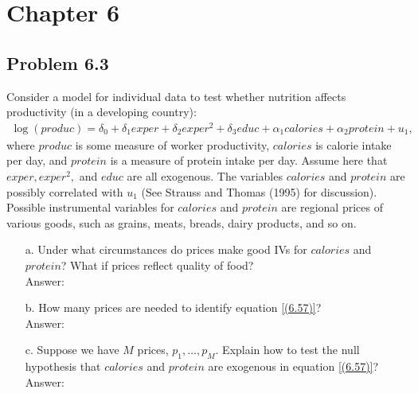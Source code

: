 \documentclass[10pt]{article}
\begin{document}
\section*{Chapter 6}
\subsection*{Problem 6.3}
Consider a model for individual data to test whether nutrition affects productivity (in a developing country):
\begin{align}
    \log(produc)=\delta_0+\delta_1exper+\delta_2exper^2+\delta_3educ+\alpha_1calories+\alpha_2protein+u_1, \tag{(6.57)} \label{(6.57)}
\end{align}
where $produc$ is some measure of worker productivity, $calories$ is calorie intake per day, and $protein$ is a measure of protein intake per day. Assume here that $exper,exper^2,$ and $educ$ are all exogenous. The variables $calories$ and $protein$ are possibly correlated with $u_1$ (See Strauss and Thomas (1995) for discussion). Possible instrumental variables for $calories$ and $protein$ are regional prices of various goods, such as grains, meats, breads, dairy products, and so on.
\begin{enumerate}
\item[a.] Under what circumstances do prices make good IVs for $calories$ and $protein$? What if prices reflect quality of food?
\\ Answer: \\

\item[b.] How many prices are needed to identify equation \eqref{(6.57)}?
\\ Answer: \\

\item[c.] Suppose we have $M$ prices, $p_1,\ldots,p_M.$ Explain how to test the null hypothesis that $calories$ and $protein$ are exogenous in equation \eqref{(6.57)}?
\\ Answer: \\
\end{enumerate}\\ 
\end{document}
